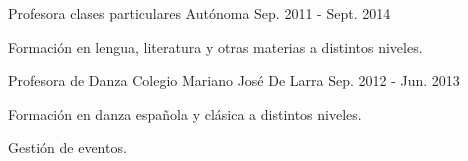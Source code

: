 

\begin{cventries}

  \cventry
    {Profesora clases particulares} %
    {Autónoma} %
    {} %
    {Sep. 2011 - Sept. 2014} %
    {
      \begin{cvitems} %
        \item {Formación en lengua, literatura y otras materias a distintos niveles.}
      \end{cvitems}
    }

  \cventry
    {Profesora de Danza} %
    {Colegio Mariano José De Larra} %
    {} %
    {Sep. 2012 - Jun. 2013} %
    {
      \begin{cvitems} %
        \item {Formación en danza española y clásica a distintos niveles.}
        \item {Gestión de eventos.}
      \end{cvitems}
    }

\end{cventries}
